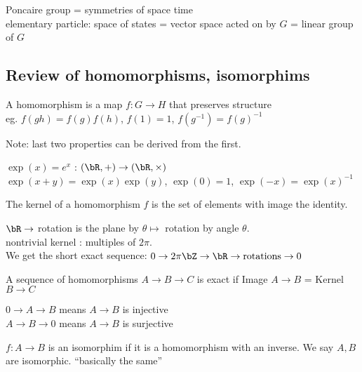 \begin{example}
    Poncaire group = symmetries of space time \\
    elementary particle: space of states = vector space acted on by $G$ = linear group of $G$
\end{example}

\subsection{Review of homomorphisms, isomorphims} 

\begin{definition}
    A homomorphism is a map $f : G \to H$ that preserves structure \\
    eg. $f(gh)=f(g)f(h)$, $f(1)=1$, $f(g^{-1}) = f(g)^{-1}$ 
\end{definition}
Note: last two properties can be derived from the first. 

\begin{example}
    $\exp(x)=e^x$ : $(\bR, +) \to (\bR, \times)$ \\
    $\exp(x+y)=\exp(x)\exp(y)$, $\exp(0)=1$, $\exp(-x)=\exp(x)^{-1}$
\end{example}

\begin{definition}
    The kernel of a homomorphism $f$ is the set of elements with image the identity. 
\end{definition}

\begin{example}
    $\bR \to $ rotation is the plane by $\theta \mapsto$ rotation by angle $\theta$. \\
    nontrivial kernel : multiples of $2 \pi$. \\
    We get the short exact sequence: $0 \to 2\pi\bZ \to \bR \to \text{rotations} \to 0$ 
\end{example}

\begin{definition}
    A sequence of homomorphisms $A \to B \to C$ is exact if Image $A \to B$ = Kernel $B \to C$
\end{definition}
$0 \to A \to B$ means $A \to B$ is injective \\
$A \to B \to 0$ means $A \to B$ is surjective 

\begin{definition}
    $f : A \to B$ is an isomorphim if it is a homomorphism with an inverse. We say $A,B$ are isomorphic. ``basically the same''
\end{definition}

